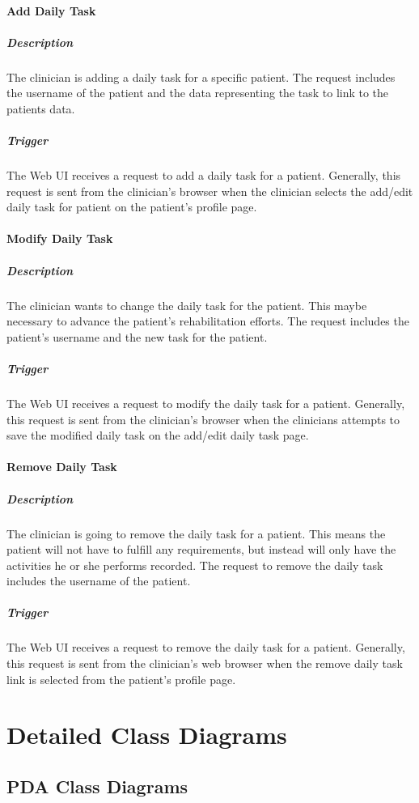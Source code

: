 \documentclass{article}
\begin{document}
\paragraph{Add Daily Task}
\subparagraph{Description}
The clinician is adding a daily task for a specific patient. The request includes the username of the patient and the data representing the task to link to the patients data.
\subparagraph{Trigger}
The Web UI receives a request to add a daily task for a patient. Generally, this request is sent from the clinician's browser when the clinician selects the add/edit daily task for patient on the patient's profile page.

\paragraph{Modify Daily Task}
\subparagraph{Description}
The clinician wants to change the daily task for the patient. This maybe necessary to advance the patient's rehabilitation efforts. The request includes the patient's username and the new task for the patient.
\subparagraph{Trigger}
The Web UI receives a request to modify the daily task for a patient. Generally, this request is sent from the clinician's browser when the clinicians attempts to save the modified daily task on the add/edit daily task page.

\paragraph{Remove Daily Task}
\subparagraph{Description}
The clinician is going to remove the daily task for a patient. This means the patient will not have to fulfill any requirements, but instead will only have the activities he or she performs recorded. The request to remove the daily task includes the username of the patient.
\subparagraph{Trigger}
The Web UI receives a request to remove the daily task  for a patient. Generally, this request is sent from the clinician's web browser when the remove daily task link is selected from the patient's profile page.

\section{Detailed Class Diagrams}

\subsection{PDA Class Diagrams}
\end{document}
